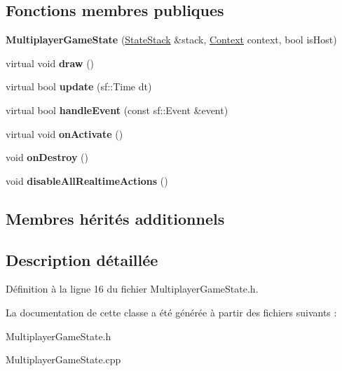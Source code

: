 \subsection*{Fonctions membres publiques}
\begin{DoxyCompactItemize}
\item 
\hypertarget{class_multiplayer_game_state_abdff9f279bb851861d1dbba9cf33d90b}{}\label{class_multiplayer_game_state_abdff9f279bb851861d1dbba9cf33d90b} 
{\bfseries Multiplayer\+Game\+State} (\hyperlink{class_state_stack}{State\+Stack} \&stack, \hyperlink{struct_state_1_1_context}{Context} context, bool is\+Host)
\item 
\hypertarget{class_multiplayer_game_state_a629171643cccd9c8914b50971a9dc940}{}\label{class_multiplayer_game_state_a629171643cccd9c8914b50971a9dc940} 
virtual void {\bfseries draw} ()
\item 
\hypertarget{class_multiplayer_game_state_a5affe4cb62f5acadcdb9b81d1766ad6a}{}\label{class_multiplayer_game_state_a5affe4cb62f5acadcdb9b81d1766ad6a} 
virtual bool {\bfseries update} (sf\+::\+Time dt)
\item 
\hypertarget{class_multiplayer_game_state_a27489fecf201c5dfd5f046f0e4f813b5}{}\label{class_multiplayer_game_state_a27489fecf201c5dfd5f046f0e4f813b5} 
virtual bool {\bfseries handle\+Event} (const sf\+::\+Event \&event)
\item 
\hypertarget{class_multiplayer_game_state_ae4f04690436f735755228e98c99f4b4f}{}\label{class_multiplayer_game_state_ae4f04690436f735755228e98c99f4b4f} 
virtual void {\bfseries on\+Activate} ()
\item 
\hypertarget{class_multiplayer_game_state_afb40e8a952b1f6264e688b80fc894bde}{}\label{class_multiplayer_game_state_afb40e8a952b1f6264e688b80fc894bde} 
void {\bfseries on\+Destroy} ()
\item 
\hypertarget{class_multiplayer_game_state_aae8391f9b734eb396bc5340d131f4441}{}\label{class_multiplayer_game_state_aae8391f9b734eb396bc5340d131f4441} 
void {\bfseries disable\+All\+Realtime\+Actions} ()
\end{DoxyCompactItemize}
\subsection*{Membres hérités additionnels}


\subsection{Description détaillée}


Définition à la ligne 16 du fichier Multiplayer\+Game\+State.\+h.



La documentation de cette classe a été générée à partir des fichiers suivants \+:\begin{DoxyCompactItemize}
\item 
Multiplayer\+Game\+State.\+h\item 
Multiplayer\+Game\+State.\+cpp\end{DoxyCompactItemize}
